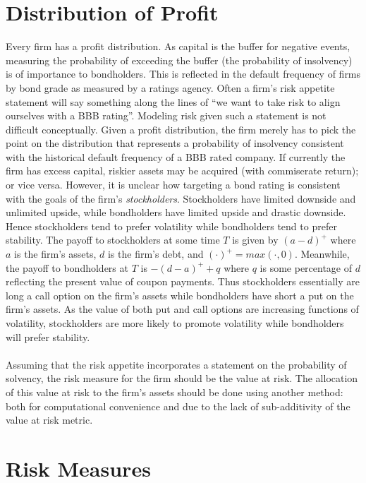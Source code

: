 \documentclass[12pt]{article}
\theoremstyle{definition}
\begin{document}
\section{Distribution of Profit}

Every firm has a profit distribution.  As capital is the buffer for negative events, measuring the probability of exceeding the buffer (the probability of insolvency) is of importance to bondholders.  This is reflected in the default frequency of firms by bond grade as measured by a ratings agency.  Often a firm's risk appetite statement will say something along the lines of ``we want to take risk to align ourselves with a BBB rating''.  Modeling risk given such a statement is not difficult conceptually.  Given a profit distribution, the firm merely has to pick the point on the distribution that represents a probability of insolvency consistent with the historical default frequency of a BBB rated company.  If currently the firm has excess capital, riskier assets may be acquired (with commiserate return); or vice versa.  However, it is unclear how targeting a bond rating is consistent with the goals of the firm's \emph{stockholders}.  Stockholders have limited downside and unlimited upside, while bondholders have limited upside and drastic downside.  Hence stockholders tend to prefer volatility while bondholders tend to prefer stability.   The payoff to stockholders at some time \(T\) is given by \((a-d)^+\) where \(a\) is the firm's assets, \(d\) is the firm's debt, and \((\cdot)^+=max(\cdot, 0)\).  Meanwhile, the payoff to bondholders at \(T\) is \(-(d-a)^+ +q\) where \(q\) is some percentage of \(d\) reflecting the present value of coupon payments.  Thus stockholders essentially are long a call option on the firm's assets while bondholders have short a put on the firm's assets.  As the value of both put and call options are increasing functions of volatility, stockholders are more likely to promote volatility while bondholders will prefer stability.  
\\
\\
Assuming that the risk appetite incorporates a statement on the probability of solvency, the risk measure for the firm should be the value at risk.  The allocation of this value at risk to the firm's assets should be done using another method: both for computational convenience and due to the lack of sub-additivity of the value at risk metric.  



\section{Risk Measures}
\end{document}
